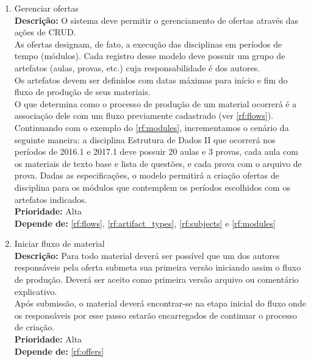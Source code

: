 \begin{enumerate}[label=\textbf{RF\protect\twodigits{\theenumi}}, leftmargin=2cm]
	\item \label{rf:offers} Gerenciar ofertas \\
		\textbf{Descrição:} O sistema deve permitir o gerenciamento de ofertas através das ações de CRUD. \\
		As ofertas designam, de fato, a execução das disciplinas em períodos de tempo (módulos). Cada registro desse modelo deve possuir um grupo de artefatos (aulas, provas, etc.) cuja responsabilidade é dos autores. \\
		Os artefatos  devem ser definidos com datas máximas para início e fim do fluxo de produção de seus materiais. \\
		O que determina como o processo de produção de um material ocorrerá é a associação dele com um fluxo previamente cadastrado (ver \hyperref[rf:flows]{\ref{rf:flows}}). \\
		Continuando com o exemplo do \hyperref[rf:modules]{\ref{rf:modules}}, incrementamos o cenário da seguinte maneira: a disciplina Estrutura de Dados II que ocorrerá nos períodos de 2016.1 e 2017.1 deve possuir 20 aulas e 3 provas, cada aula com os materiais de texto base e lista de questões, e cada prova com o arquivo de prova. Dadas as especificações, o modelo permitirá a criação ofertas de disciplina para os módulos que contemplem os períodos escolhidos com os artefatos indicados. \\
		\textbf{Prioridade:} Alta \\
		\textbf{Depende de:} \hyperref[rf:flows]{\ref{rf:flows}}, \hyperref[rf:artifact_types]{\ref{rf:artifact_types}}, \hyperref[rf:subjects]{\ref{rf:subjects}} e \hyperref[rf:modules]{\ref{rf:modules}}
		
	
			
	\item \label{rf:init_flow} Iniciar fluxo de material \\ 
		\textbf{Descrição:} Para todo material deverá ser possível que um dos autores responsáveis pela oferta submeta sua primeira versão iniciando assim o fluxo de produção. Deverá ser aceito como primeira versão arquivo ou comentário explicativo.  \\
		Após submissão, o material deverá encontrar-se na etapa inicial do fluxo onde os responsáveis por esse passo estarão encarregados de continuar o processo de criação. \\
		\textbf{Prioridade:} Alta \\
		\textbf{Depende de:} \hyperref[rf:offers]{\ref{rf:offers}}


\end{enumerate}
